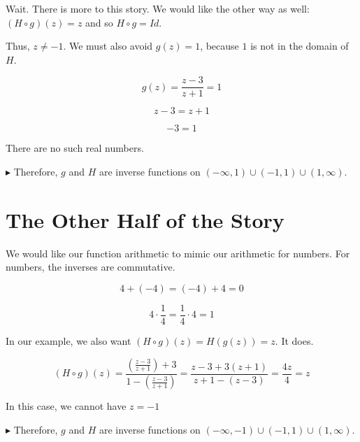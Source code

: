 \documentclass{ximera}
\begin{document}
Wait.  There is more to this story. We would like the other way as well: $(H \circ g)(z) = z$ and so $H \circ g = Id$.


Thus, $z \ne -1$.  We must also avoid $g(z) = 1$, because $1$ is not in the domain of $H$.



\[
g(z) = \frac{z-3}{z+1} = 1
\]

\[
z - 3 = z + 1 
\]


\[
-3 = 1
\]


There are no such real numbers.













$\blacktriangleright$ Therefore, $g$ and $H$ are inverse functions on $(-\infty, 1) \cup (-1, 1) \cup (1,\infty)$.




















\section{The Other Half of the Story}


We would like our function arithmetic to mimic our arithmetic for numbers.  For numbers, the inverses are commutative.

\[
4 + (-4) = (-4) + 4 = 0
\]


\[
4 \cdot \frac{1}{4} = \frac{1}{4} \cdot 4 = 1
\]



In our example, we also want $(H \circ g)(z) = H(g(z)) = z$. It does.


\[
(H \circ g)(z) = \frac{\left( \frac{z-3}{z+1} \right) + 3}{1 - \left(  \frac{z-3}{z+1}\right)} = \frac{z-3 + 3(z+1)}{z+1-(z-3)} = \frac{4z}{4} = z
\]


In this case, we cannot have $z = -1$






$\blacktriangleright$  Therefore, $g$ and $H$ are inverse functions on $(-\infty, -1) \cup (-1, 1) \cup (1, \infty)$.
\end{document}
